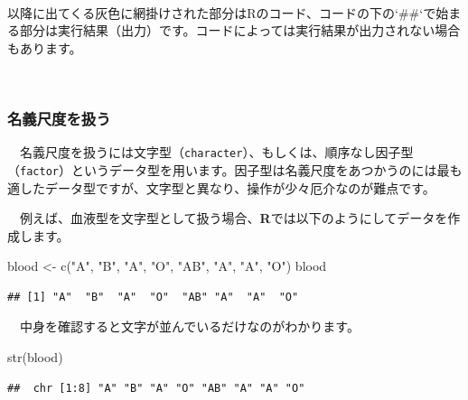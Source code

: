 \documentclass[
  12pt,
]{book}
\newenvironment{Shaded}{\begin{snugshade}}{\end{snugshade}}
\newcommand{\FunctionTok}[1]{\textcolor[rgb]{0.00,0.00,0.00}{#1}}
\newcommand{\NormalTok}[1]{#1}
\newcommand{\OtherTok}[1]{\textcolor[rgb]{0.56,0.35,0.01}{#1}}
\newcommand{\StringTok}[1]{\textcolor[rgb]{0.31,0.60,0.02}{#1}}
\begin{document}
　

\begin{hint-box}
以降に出てくる灰色に網掛けされた部分はRのコード、コードの下の`\#\#`で始まる部分は実行結果（出力）です。コードによっては実行結果が出力されない場合もあります。
\end{hint-box}

　

\hypertarget{ux540dux7fa9ux5c3aux5ea6ux3092ux6271ux3046}{%
\subsubsection*{名義尺度を扱う}\label{ux540dux7fa9ux5c3aux5ea6ux3092ux6271ux3046}}

　名義尺度を扱うには文字型（\texttt{character}）、もしくは、順序なし因子型（\texttt{factor}）というデータ型を用います。因子型は名義尺度をあつかうのには最も適したデータ型ですが、文字型と異なり、操作が少々厄介なのが難点です。

　例えば、血液型を文字型として扱う場合、\textbf{R}では以下のようにしてデータを作成します。

\begin{Shaded}
\begin{Highlighting}[numbers=left,,]
\NormalTok{blood }\OtherTok{\textless{}{-}} \FunctionTok{c}\NormalTok{(}\StringTok{"A"}\NormalTok{, }\StringTok{"B"}\NormalTok{, }\StringTok{"A"}\NormalTok{, }\StringTok{"O"}\NormalTok{, }\StringTok{"AB"}\NormalTok{, }\StringTok{"A"}\NormalTok{, }\StringTok{"A"}\NormalTok{, }\StringTok{"O"}\NormalTok{)}
\NormalTok{blood}
\end{Highlighting}
\end{Shaded}

\begin{verbatim}
## [1] "A"  "B"  "A"  "O"  "AB" "A"  "A"  "O"
\end{verbatim}

　中身を確認すると文字が並んでいるだけなのがわかります。

\begin{Shaded}
\begin{Highlighting}[numbers=left,,]
\FunctionTok{str}\NormalTok{(blood)}
\end{Highlighting}
\end{Shaded}

\begin{verbatim}
##  chr [1:8] "A" "B" "A" "O" "AB" "A" "A" "O"
\end{verbatim}
\end{document}
